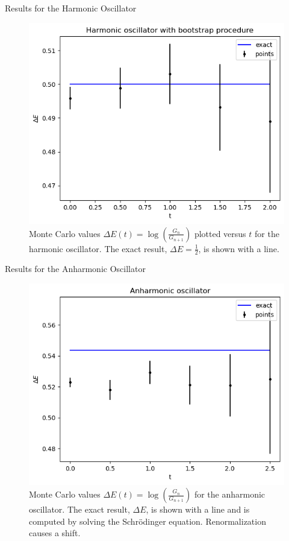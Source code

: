 \documentclass{beamer}
\begin{document}
\begin{frame}{Results for the Harmonic Oscillator}
    \begin{figure}
        \centering
        \includegraphics[width=0.5\linewidth]{harmonic_oscillator.png}
        \caption{Monte Carlo values $\Delta E(t) = \log \left( \frac{G_n}{G_{n+1}} \right)$ plotted versus $t$ for the harmonic oscillator. The exact result, $\Delta E = \frac{1}{2}$, is shown with a line.}
        \label{fig:harmonic_oscillator_basic}
    \end{figure}
\end{frame}

\begin{frame}{Results for the Anharmonic Oscillator}
    \begin{figure}
        \centering
        \includegraphics[width=0.5\linewidth]{anharmonic_oscillator_basic.png}
        \caption{Monte Carlo values $\Delta E(t) = \log \left( \frac{G_n}{G_{n+1}} \right)$ for the anharmonic oscillator. The exact result, $\Delta E$, is shown with a line and is computed by solving the Schrödinger equation. Renormalization causes a shift.}
        \label{fig:anharmonic_oscillator_basic}
    \end{figure}
\end{frame}
\end{document}
